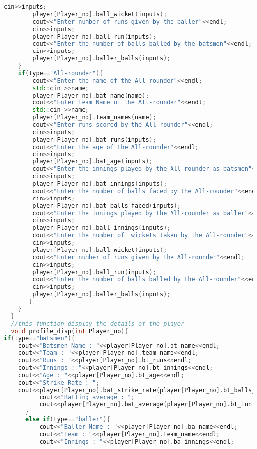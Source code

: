 \documentclass{article}
\begin{document}
\begin{lstlisting}[style=chstyle,language=C++]
        cin>>inputs;
        player[Player_no].ball_wicket(inputs);
        cout<<"Enter number of runs given by the baller"<<endl;
        cin>>inputs;
        player[Player_no].ball_run(inputs);
        cout<<"Enter the number of balls balled by the batsmen"<<endl;
        cin>>inputs;
        player[Player_no].baller_balls(inputs);
    }
    if(type=="All-rounder"){
        cout<<"Enter the name of the All-rounder"<<endl;
        std::cin >>name;
        player[Player_no].bat_name(name);
        cout<<"Enter team Name of the All-rounder"<<endl;
        std::cin >>name;
        player[Player_no].team_names(name);
        cout<<"Enter runs scored by the All-rounder"<<endl;
        cin>>inputs;
        player[Player_no].bat_runs(inputs);
        cout<<"Enter the age of the All-rounder"<<endl;
        cin>>inputs;
        player[Player_no].bat_age(inputs);
        cout<<"Enter the innings played by the All-rounder as batsmen"<<endl;
        cin>>inputs;
        player[Player_no].bat_innings(inputs);
        cout<<"Enter the number of balls faced by the All-rounder"<<endl;
        cin>>inputs;
        player[Player_no].bat_balls_faced(inputs);
        cout<<"Enter the innings played by the All-rounder as baller"<<endl;
        cin>>inputs;
        player[Player_no].ball_innings(inputs);
        cout<<"Enter the number of  wickets taken by the All-rounder"<<endl;
        cin>>inputs;
        player[Player_no].ball_wicket(inputs);
        cout<<"Enter number of runs given by the All-rounder"<<endl;
        cin>>inputs;
        player[Player_no].ball_run(inputs);
        cout<<"Enter the number of balls balled by the All-rounder"<<endl;
        cin>>inputs;
        player[Player_no].baller_balls(inputs);
       }
    }
  }
  //this function display the details of the player
  void profile_disp(int Player_no){
if(type=="batsmen"){
    cout<<"Batsmen Name : "<<player[Player_no].bt_name<<endl;
    cout<<"Team : "<<player[Player_no].team_name<<endl;
    cout<<"Runs : "<<player[Player_no].bt_runs<<endl;
    cout<<"Innings : "<<player[Player_no].bt_innings<<endl;
    cout<<"Age : "<<player[Player_no].bt_age<<endl;
    cout<<"Strike Rate : ";
    cout<<player[Player_no].bat_strike_rate(player[Player_no].bt_balls_faced,player[Player_no].bt_runs)<<endl;
          cout<<"Batting average : ";
          cout<<player[Player_no].bat_average(player[Player_no].bt_innings,player[Player_no].bt_runs)<<endl;
      }
      else if(type=="baller"){
          cout<<"Baller Name : "<<player[Player_no].ba_name<<endl;
          cout<<"Team : "<<player[Player_no].team_name<<endl;
          cout<<"Innings : "<<player[Player_no].ba_innings<<endl;

\end{lstlisting}
\end{document}
